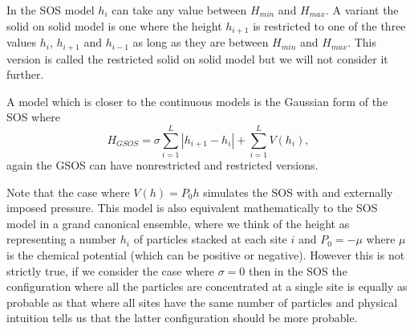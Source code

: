 In the SOS model $h_i$ can take any value between $H_{min}$ and $H_{max}$. A variant the solid on solid model is one where the height $h_{i+1}$ is restricted to one of the three  values $h_i$, $h_{i+1}$ and $h_{i-1}$ as long as they are between $H_{min}$ and $H_{max}$. This version is called the restricted solid on solid model but we will not consider it further. 

A model which is closer to the continuous models is the Gaussian form of the SOS where
\begin{equation}
H_{GSOS} = \sigma\sum_{i=1}^L |h_{i+1}- h_{i}| + \sum_{i=1}^L V(h_i),
\end{equation}
again the GSOS can have nonrestricted and restricted versions. 

Note that the case where $V(h)=P_0h$ simulates the SOS with and externally imposed pressure. This model is also equivalent mathematically to the SOS model in a grand canonical ensemble, where we think of the height as representing a number $h_i$ of particles stacked at each site $i$ and $P_0=-\mu$ where $\mu$ is the chemical potential (which can be positive or negative). However this is not strictly true, if we consider the case where $\sigma=0$ then in the SOS the configuration where all the particles are concentrated at a single site is equally as probable as that where all sites have the same number of particles and physical intuition tells us that the latter configuration should be more probable.

